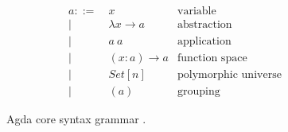 \begin{figure}[h]
\begin{align*}
a ::=~& x               & \text{variable}\\
    |~& \lambda x \to a & \text{abstraction}\\
    |~& a~a             & \text{application}\\
    |~& (x : a) \to a   & \text{function space}\\
    |~& Set[n]          & \text{polymorphic universe}\\
    |~& (a)             & \text{grouping}
\end{align*}
\caption{Agda core syntax grammar \citep{agdawiki}.}
\label{fig:grammar}
\end{figure}
